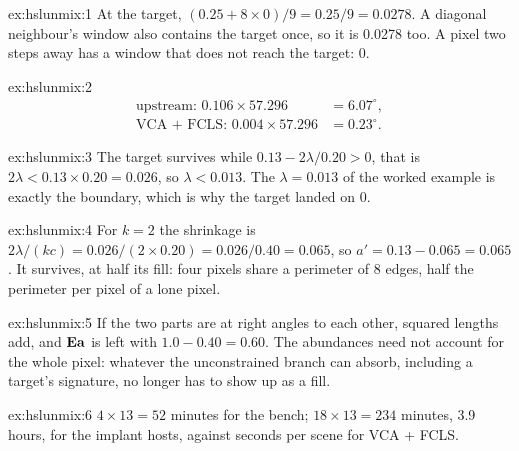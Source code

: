 
\begin{solution}{ex:hslunmix:1}
At the target, $(0.25+8\times0)/9=0.25/9=0.0278$. A diagonal neighbour's window also contains the target once, so it is
0.0278 too. A pixel two steps away has a window that does not reach the target: 0.
\end{solution}

\begin{solution}{ex:hslunmix:2}
\begin{align*}
\text{upstream: } 0.106\times57.296 &= 6.07^\circ,\\
\text{VCA + FCLS: } 0.004\times57.296 &= 0.23^\circ .
\end{align*}
\end{solution}

\begin{solution}{ex:hslunmix:3}
The target survives while $0.13-2\lambda/0.20>0$, that is $2\lambda<0.13\times0.20=0.026$, so $\lambda<0.013$. The
$\lambda=0.013$ of the worked example is exactly the boundary, which is why the target landed on 0.
\end{solution}

\begin{solution}{ex:hslunmix:4}
For $k=2$ the shrinkage is $2\lambda/(kc)=0.026/(2\times0.20)=0.026/0.40=0.065$, so $a'=0.13-0.065=0.065$. It survives, at
half its fill: four pixels share a perimeter of 8 edges, half the perimeter per pixel of a lone pixel.
\end{solution}

\begin{solution}{ex:hslunmix:5}
If the two parts are at right angles to each other\tagA, squared lengths add, and $\mathbf{E}\mathbf{a}$ is left with
$1.0-0.40=0.60$. The abundances need not account for the whole pixel: whatever the unconstrained branch can absorb,
including a target's signature, no longer has to show up as a fill.
\end{solution}

\begin{solution}{ex:hslunmix:6}
$4\times13=52$ minutes for the bench; $18\times13=234$ minutes, 3.9 hours, for the implant hosts, against seconds per scene
for VCA + FCLS.
\end{solution}
